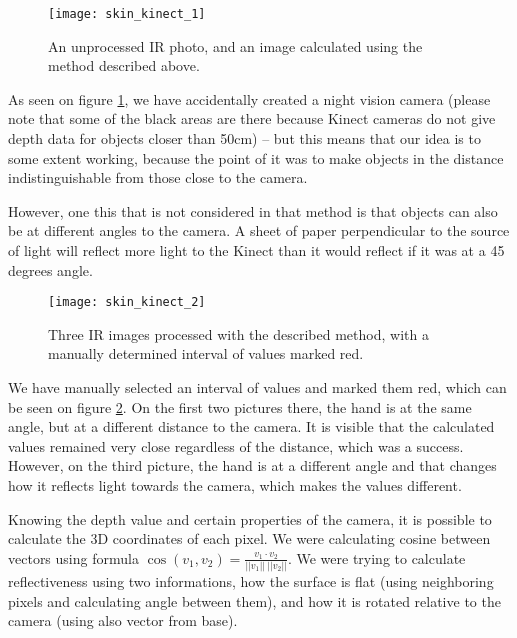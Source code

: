             \begin{figure}[H]
                \caption{An unprocessed IR photo, and an image calculated using
                the method described above.}
                \centering
                \texttt{[image: skin\_kinect\_1]}
                \label{fig:skin_kinect_1}
            \end{figure}

            As seen on figure \ref{fig:skin_kinect_1}, we have accidentally created
            a night vision camera (please note that some of the black areas are there because Kinect cameras do not give depth data for objects closer than 50cm)
            -- but this means that our idea is to some extent working, because the point
            of it was to make objects in the distance indistinguishable from those close
            to the camera.

            However, one this that is not considered in that method is that objects
            can also be at different angles to the camera.
            A sheet of paper perpendicular to the source of light will reflect more
            light to the Kinect than it would reflect if it was at a 45 degrees angle.

            \begin{figure}[H]
                \caption{Three IR images processed with the described method, with a
                manually determined interval of values marked red.}
                \centering
                \texttt{[image: skin\_kinect\_2]}
                \label{fig:skin_kinect_2}
            \end{figure}

            We have manually selected an interval of values and marked them red, which
            can be seen on figure \ref{fig:skin_kinect_2}.
            On the first two pictures there, the hand is at the same angle, but at a
            different distance to the camera.
            It is visible that the calculated values remained very close regardless
            of the distance, which was a success.
            However, on the third picture, the hand is at a different angle and
            that changes how it reflects light towards the camera, which makes the values
            different.

            Knowing the depth value and certain properties of the camera, it is possible
            to calculate the 3D coordinates of each pixel.
            We were calculating cosine between vectors using formula
            $\cos(v_1, v_2) = \frac{v_1 \cdot v_2}{||v_1||~||v_2||}$.
            We were trying to calculate reflectiveness using two informations,
            how the surface is flat (using neighboring pixels and calculating angle between them),
            and how it is rotated relative to the camera (using also vector from base).

